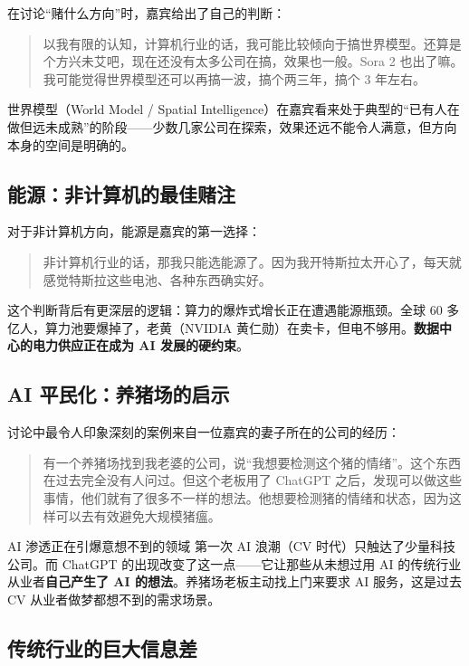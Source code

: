 在讨论``赌什么方向''时，嘉宾给出了自己的判断：

\begin{quote}
以我有限的认知，计算机行业的话，我可能比较倾向于搞世界模型。还算是个方兴未艾吧，现在还没有太多公司在搞，效果也一般。Sora 2 也出了嘛。我可能觉得世界模型还可以再搞一波，搞个两三年，搞个 3 年左右。
\end{quote}

世界模型（World Model / Spatial Intelligence）在嘉宾看来处于典型的``已有人在做但远未成熟''的阶段——少数几家公司在探索，效果还远不能令人满意，但方向本身的空间是明确的。

\subsection{能源：非计算机的最佳赌注}

对于非计算机方向，能源是嘉宾的第一选择：

\begin{quote}
非计算机行业的话，那我只能选能源了。因为我开特斯拉太开心了，每天就感觉特斯拉这些电池、各种东西确实好。
\end{quote}

这个判断背后有更深层的逻辑：算力的爆炸式增长正在遭遇能源瓶颈。全球 60 多亿人，算力池要爆掉了，老黄（NVIDIA 黄仁勋）在卖卡，但电不够用。\textbf{数据中心的电力供应正在成为 AI 发展的硬约束}。

\subsection{AI 平民化：养猪场的启示}

讨论中最令人印象深刻的案例来自一位嘉宾的妻子所在的公司的经历：

\begin{quote}
有一个养猪场找到我老婆的公司，说``我想要检测这个猪的情绪''。这个东西在过去完全没有人问过。但这个老板用了 ChatGPT 之后，发现可以做这些事情，他们就有了很多不一样的想法。他想要检测猪的情绪和状态，因为这样可以去有效避免大规模猪瘟。
\end{quote}

\begin{importantbox}{AI 渗透正在引爆意想不到的领域}
第一次 AI 浪潮（CV 时代）只触达了少量科技公司。而 ChatGPT 的出现改变了这一点——它让那些从未想过用 AI 的传统行业从业者\textbf{自己产生了 AI 的想法}。养猪场老板主动找上门来要求 AI 服务，这是过去 CV 从业者做梦都想不到的需求场景。
\end{importantbox}

\subsection{传统行业的巨大信息差}

